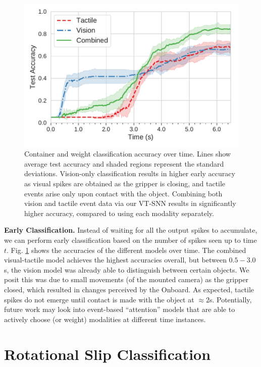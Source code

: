 \documentclass[fyp]{socreport}
\begin{document}
\begin{figure}
  \centering
  \includegraphics[width=0.85\columnwidth]{images/analysis/object_det_over_time.pdf}
  \caption{Container and weight classification accuracy over time. Lines show
    average test accuracy and shaded regions represent the standard deviations.
    Vision-only classification results in higher early accuracy as visual spikes
    are obtained as the gripper is closing, and tactile events arise only upon
    contact with the object. Combining both vision and tactile event data via
    our VT-SNN results in significantly higher accuracy, compared to using each
    modality separately. }
\label{fig:classtime}
\end{figure}

\noindent\textbf{Early Classification.} Instead of waiting for all the output
spikes to accumulate, we can perform early classification based on the number of
spikes seen up to time $t$. Fig. \ref{fig:classtime} shows the accuracies of the
different models over time. The combined visual-tactile model achieves the
highest accuracies overall, but between $0.5-3.0$s, the vision model was already
able to distinguish between certain objects. We posit this was due to small
movements (of the mounted camera) as the gripper closed, which resulted in
changes perceived by the Onboard. As expected, tactile spikes do not emerge
until contact is made with the object at $\approx 2$s. Potentially, future work
may look into event-based ``attention'' models that are able to actively choose
(or weight) modalities at different time instances.

\section{Rotational Slip Classification}
\label{sec:slip}
\end{document}
